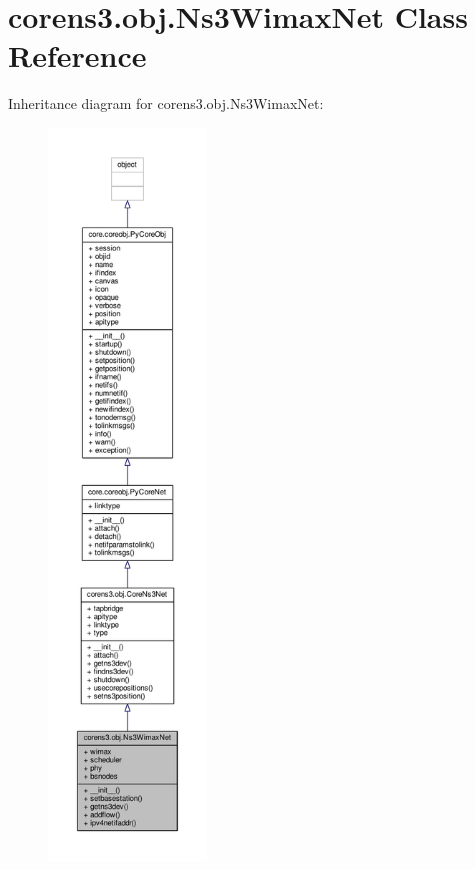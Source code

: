 \hypertarget{classcorens3_1_1obj_1_1_ns3_wimax_net}{\section{corens3.\+obj.\+Ns3\+Wimax\+Net Class Reference}
\label{classcorens3_1_1obj_1_1_ns3_wimax_net}
}


Inheritance diagram for corens3.\+obj.\+Ns3\+Wimax\+Net\+:
\nopagebreak
\begin{figure}[H]
\begin{center}
\leavevmode
\includegraphics[height=550pt]{classcorens3_1_1obj_1_1_ns3_wimax_net__inherit__graph}
\end{center}
\end{figure}


